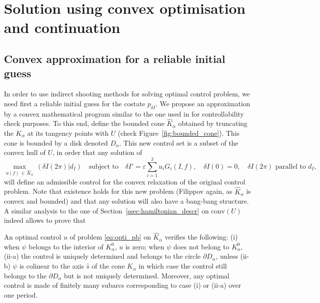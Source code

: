 \documentclass[AMA,STIX1COL]{WileyNJD-v2}
\newcommand{\conv}{\text{conv}}
\newcommand{\veps}{\varepsilon}
\newcommand{\mybar}[1]{#1}
\begin{document}
\section{Solution using convex optimisation and continuation} \label{sec3}

\subsection{Convex approximation for a reliable initial guess} %
\label{sec:convex_pb_initial_guess}
In order to use indirect shooting methods for solving optimal control problem, we need first a
reliable initial guess for the costate $p_{\delta I}$.
We propose an approximation by a convex mathematical program similar to the one used in
\cite{herasimenka:hal-03185532} for controllability check purposes.
To this end, define the bounded cone $\hat{K}_{\alpha}$ obtained by truncating the $K_\alpha$ at its 
tangency points with $U$ (check Figure~\ref{fig:bounded_cone}). This cone is bounded by a disk denoted
$D_\alpha$. This new control set is a subset of the convex hull of $U$, in order that any solution of 
\begin{equation}
	\label{eq:opti_pb}
	\max_{u(f) \, \in \, \hat{K}_{\alpha}} \, (\delta I(2\pi)|d_I) \quad \textrm{subject to} \quad
	\delta I' = \veps \sum_{i=1}^3 u_i G_i (\mybar{I}, f),\quad \delta I(0)=0,\quad \delta I(2\pi)
	\text{ parallel to } d_I,
\end{equation}
will define an admissible control for the convex relaxation of the original control problem.
Note that existence holds for this new problem (Filippov again, as $\hat{K}_\alpha$ is convex and bounded)
and that any solution will also have a bang-bang structure. A similar analysis to the one of
Section~\ref{ssec:hamiltonian_descr} on $\conv(U)$ indeed allows to prove that

\begin{proposition} \label{prop102}
An optimal control $u$ of problem \eqref{eq:opti_pb} on $\hat{K}_\alpha$ verifies the following:
(i) when $\psi$ belongs to the interior of $K_\alpha^0$, $u$ is zero;
when $\psi$ does not belong to $K_\alpha^0$, (ii-a) the control is uniquely determined and belongs to
the circle $\partial D_\alpha$, unless (ii-b) $\psi$ is colinear to the axis $\hat{s}$ of
the cone $K_\alpha$ in which case the control still belongs to the $\partial D_\alpha$ but
is not uniquely determined.
Moreover, any optimal control is made of finitely many subarcs corresponding to case (i) or (ii-a)
over one period. 
\end{proposition}
\end{document}
